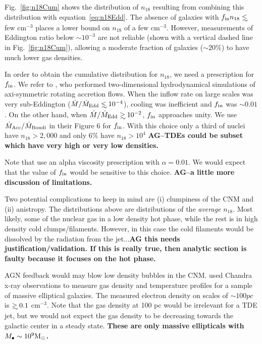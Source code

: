 \documentclass[usenatbib,fleqn]{mnras}
\newcommand\lsim{\mathrel{\rlap{\lower4pt\hbox{\hskip1pt$\sim$}}
    \raise1pt\hbox{$<$}}}
\newcommand\gsim{\mathrel{\rlap{\lower4pt\hbox{\hskip1pt$\sim$}}
    \raise1pt\hbox{$>$}}}
\newcommand{\Mbh}[1][]{M_{\bullet#1}}
\newcommand{\Msun}{{\rm M_\odot}}
\begin{document}
Fig.~\ref{fig:n18Cum} shows the distribution of $n_{18}$ resulting
from combining this distribution with equation~\eqref{eq:n18Edd}.  The
absence of galaxies with $f_{\rm in }n_{18} \lsim$ few cm$^{-3}$
places a lower bound on $n_{18}$ of a few cm$^{-3}$.  However,
measurements of Eddington ratio below $\sim 10^{-3}$ are not reliable
(shown with a vertical dashed line in Fig.~\ref{fig:n18Cum}), allowing
a moderate fraction of galaxies ($\sim 20\%$) to have much lower gas
densities.


In order to obtain the cumulative distribution for $n_{18}$, we need a
prescription for $f_{\rm in}$. We refer to \citet{Li+2013}, who
performed two-dimensional hydrodynamical simulations of axi-symmetric
rotating accretion flows. When the inflow rate on large scales was
very sub-Eddington ($\dot{M}/\dot{M}_{\rm Edd} \lsim 10^{-4}$),
cooling was inefficient and $f_{\rm in}$ was $\sim 0.01$. On the other
hand, when $\dot{M}/\dot{M}_{\rm Edd}\gsim 10^{-2}$, $f_{\rm in}$
approaches unity.  We use $\dot{M}_{\rm Acc}/\dot{M}_{\rm Bondi}$ in
their Figure 6 for $f_{\rm in}$.  With this choice only a third of
nuclei have $n_{18}>2,000$ and only 6\% have $n_{18}>10^{4}$ {\bf
  AG--TDEs could be subset which have very high or very low
  densities.}

Note that \citet{Li+2013} use an alpha viscosity prescription with
$\alpha=0.01$. We would expect that the value of $f_{\rm in}$ would be
sensitive to this choice. {\bf AG--a little more discussion of limitations.}

Two potential complications to keep in mind are (i) clumpiness of the
CNM and (ii) anistropy. The distributions above are
distributions of the {\it average} $n_{18}$.  Most likely, some of the
nuclear gas in a low density hot phase, while the rest is in high density
cold clumps/filaments. However, in this case the cold filaments would
be dissolved by the radiation from the jet...{\bf AG this needs
  justification/validation. If this is really true, then analytic
  section is faulty because it focuses on the hot phase.}


AGN feedback would may blow low density bubbles in the
CNM. \citet{Russell+2013} used Chandra x-ray observations to measure gas
density and temperature profiles for a sample of massive elliptical
galaxies. The measured electron density on scales of $\sim 100
pc$ is $\gsim 0.1$ cm$^{-3}$. Note that the gas density at 100 pc
would be irrelevant for a TDE jet, but we would not expect the gas
density to be decreasing towards the galactic center in a steady
state. {\bf These are only massive ellipticals with $\Mbh\sim 10^{9} \Msun$.}
\end{document}
